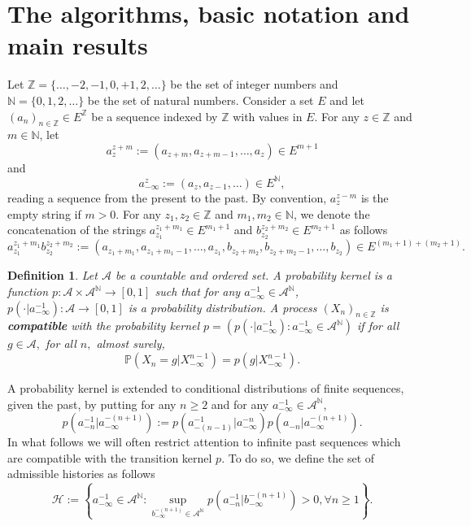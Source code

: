 \documentclass[a4paper]{article}
\newtheorem{definition}{Definition}%
\def\P{{\mathbb P}}
\newcommand{\Z}{\mathbb{Z}}
\newcommand{\N}{\mathbb{N}}
\renewcommand{\H}{\mathcal{H}}
\newcommand{\A}{\mathcal{A}}
\newcommand{\mydef}{:=}
\begin{document}
\section{The algorithms, basic notation and main results} \label{sec:algonotationresults}

Let $\Z=\{\ldots,-2,-1,0,+1,2,\ldots\}$ be the set of integer numbers and $\N=\{0,1,2,\ldots\}$ be the set of natural numbers. Consider a set ${E}$ and let $ (a_n)_{n \in \Z } \in E^\Z $ be a sequence indexed by $ \Z $ with values in $E.$  For any $z\in \Z$ and $m\in \N$, let
$$
a_z^{z+m}\mydef (a_{z+m}, a_{z+m-1},\ldots, a_z) \in E^{m+1}
$$
and
$$
a_{-\infty}^{z} \mydef (a_{z}, a_{z-1},\ldots) \in E^{\N},
$$
reading a sequence from the present to the past. By convention, $a_z^{z-m}$ is the empty string if $ m > 0.$ For any $z_1,z_2\in \Z$ and $m_1,m_2\in \N$, we denote the concatenation of the strings $a_{z_1}^{z_1+m_1} \in E^{m_1+1}$ and $b_{z_2}^{z_2+m_2} \in E^{ m_2 +1 }$ as follows
$$
a_{z_1}^{z_1+m_1}b_{z_2}^{z_2+m_2} \mydef (a_{z_1+m_1}, a_{z_1+m_1-1},\ldots, a_{z_1}, b_{z_2+m_2}, b_{z_2+m_2-1},\ldots, b_{z_2} )\in E^{(m_1+1)+(m_2+1)} .
$$


\begin{definition} \label{def:kernel_and_adimissible_histories}
Let $\A$ be a countable and ordered set. A probability kernel is a function $p:\A \times \A^{\N} \to [0,1]$ such that
for any $a_{-\infty}^{-1} \in \A^{\N}$, $p(\cdot | a_{-\infty}^{-1}):\A \to [0,1]$ is a probability distribution. A process $(X_n)_{n \in \Z}$ is \textbf{compatible} with the probability kernel $p=(p(\cdot |a_{-\infty}^{-1}):a_{-\infty}^{-1} \in \A^{\N})$ if for all $g \in \A, $ for all $n,$ almost surely, 
$$ \P ( X_n = g | X^{n-1}_{- \infty} ) = p ( g |  X^{n-1}_{- \infty} ) .$$
\end{definition}

A probability kernel is extended to conditional distributions of finite sequences, given the past, by putting for any $n\geq 2$ and for any $a_{-\infty}^{-1} \in \A^{\N}$,
$$
p(a_{-n}^{-1}|a_{-\infty}^{-(n+1)})\mydef p(a_{-(n-1)}^{-1}|a_{-\infty}^{-n})p(a_{-n}|a_{-\infty}^{-(n+1)}).
$$
In what follows we will often restrict attention to infinite past sequences which are compatible with the transition kernel $p.$ To do so, we define the set of admissible histories as follows
\begin{equation} \label{eq:admissiblehistories}
\H := \left\{a_{-\infty}^{-1}\in \A^{\N}: \sup_{b_{-\infty}^{-(n+1)} \in \A^{\N}}p(a_{-n}^{-1}|b_{-\infty}^{-(n+1)})>0, \forall n\geq 1 \right\}.
\end{equation}
\end{document}
